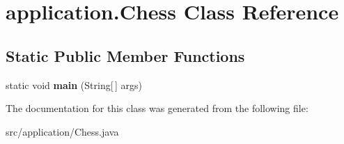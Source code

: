 \hypertarget{classapplication_1_1_chess}{\section{application.\+Chess Class Reference}
\label{classapplication_1_1_chess}
}
\subsection*{Static Public Member Functions}
\begin{DoxyCompactItemize}
\item 
\hypertarget{classapplication_1_1_chess_aa724f30b1b436386ea596dcee0680aa6}{static void {\bfseries main} (String\mbox{[}$\,$\mbox{]} args)}\label{classapplication_1_1_chess_aa724f30b1b436386ea596dcee0680aa6}

\end{DoxyCompactItemize}


The documentation for this class was generated from the following file\+:\begin{DoxyCompactItemize}
\item 
src/application/Chess.\+java\end{DoxyCompactItemize}
